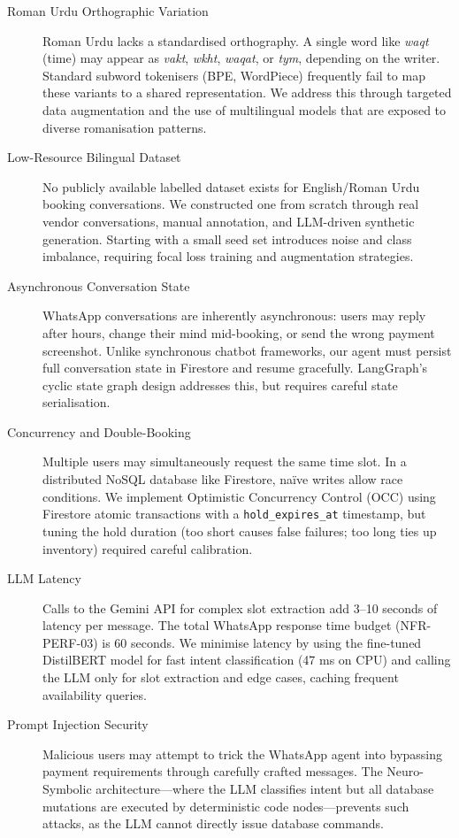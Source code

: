 \begin{description}
  \item[Roman Urdu Orthographic Variation]
        Roman Urdu lacks a standardised orthography.  A single word like
        \textit{waqt} (time) may appear as \textit{vakt}, \textit{wkht},
        \textit{waqat}, or \textit{tym}, depending on the writer.  Standard subword
        tokenisers (BPE, WordPiece) frequently fail to map these variants to a shared
        representation.  We address this through targeted data augmentation and the
        use of multilingual models that are exposed to diverse romanisation patterns.

  \item[Low-Resource Bilingual Dataset]
        No publicly available labelled dataset exists for English/Roman Urdu booking
        conversations.  We constructed one from scratch through real vendor
        conversations, manual annotation, and LLM-driven synthetic generation.
        Starting with a small seed set introduces noise and class imbalance, requiring
        focal loss training and augmentation strategies.

  \item[Asynchronous Conversation State]
        WhatsApp conversations are inherently asynchronous: users may reply after
        hours, change their mind mid-booking, or send the wrong payment screenshot.
        Unlike synchronous chatbot frameworks, our agent must persist full
        conversation state in Firestore and resume gracefully.  LangGraph's cyclic
        state graph design addresses this, but requires careful state serialisation.

  \item[Concurrency and Double-Booking]
        Multiple users may simultaneously request the same time slot.  In a
        distributed NoSQL database like Firestore, na{\"i}ve writes allow race
        conditions.  We implement Optimistic Concurrency Control (OCC) using
        Firestore atomic transactions with a \texttt{hold\_expires\_at} timestamp,
        but tuning the hold duration (too short causes false failures; too long ties
        up inventory) required careful calibration.

  \item[LLM Latency]
        Calls to the Gemini API for complex slot extraction add 3--10 seconds of
        latency per message.  The total WhatsApp response time budget (NFR-PERF-03)
        is 60 seconds.  We minimise latency by using the fine-tuned DistilBERT model
        for fast intent classification (47 ms on CPU) and calling the LLM only for
        slot extraction and edge cases, caching frequent availability queries.

  \item[Prompt Injection Security]
        Malicious users may attempt to trick the WhatsApp agent into bypassing payment
        requirements through carefully crafted messages.  The Neuro-Symbolic
        architecture---where the LLM classifies intent but all database mutations are
        executed by deterministic code nodes---prevents such attacks, as the LLM
        cannot directly issue database commands.
\end{description}

